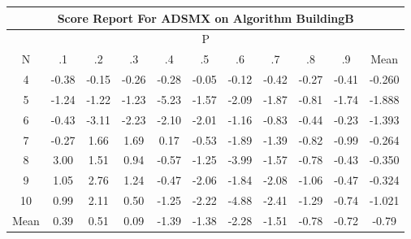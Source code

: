 \documentclass[11pt,a4paper]{report}
\begin{document}
\begin{longtable}{ | c || c | c | c | c | c | c | c | c | c || c |}
\hline
\multicolumn{11}{|c|}{ Score Report For ADSMX on Algorithm BuildingB} \\
\hline
\multicolumn{11}{|c|}{ P } \\
\hline
N & .1 & .2 & .3 & .4 & .5 & .6 & .7 & .8 & .9 & Mean\\
 \hline
 \hline
 \endhead
  4 &  \cellcolor[HTML]{FFF7F7} -0.38 &  \cellcolor[HTML]{FFFFFF} -0.15 &  \cellcolor[HTML]{FFF7F7} -0.26 &  \cellcolor[HTML]{FFF7F7} -0.28 &  \cellcolor[HTML]{FFFFFF} -0.05 &  \cellcolor[HTML]{FFFFFF} -0.12 &  \cellcolor[HTML]{FFF7F7} -0.42 &  \cellcolor[HTML]{FFF7F7} -0.27 &  \cellcolor[HTML]{FFF7F7} -0.41 & -0.260 \\
  5 &  \cellcolor[HTML]{FFDFDF} -1.24 &  \cellcolor[HTML]{FFDFDF} -1.22 &  \cellcolor[HTML]{FFDFDF} -1.23 &  \cellcolor[HTML]{FF8080} -5.23 &  \cellcolor[HTML]{FFD7D7} -1.57 &  \cellcolor[HTML]{FFC7C7} -2.09 &  \cellcolor[HTML]{FFCFCF} -1.87 &  \cellcolor[HTML]{FFE7E7} -0.81 &  \cellcolor[HTML]{FFD7D7} -1.74 & -1.888 \\
  6 &  \cellcolor[HTML]{FFF7F7} -0.43 &  \cellcolor[HTML]{FFAFAF} -3.11 &  \cellcolor[HTML]{FFC7C7} -2.23 &  \cellcolor[HTML]{FFC7C7} -2.10 &  \cellcolor[HTML]{FFCFCF} -2.01 &  \cellcolor[HTML]{FFDFDF} -1.16 &  \cellcolor[HTML]{FFE7E7} -0.83 &  \cellcolor[HTML]{FFF7F7} -0.44 &  \cellcolor[HTML]{FFF7F7} -0.23 & -1.393 \\
  7 &  \cellcolor[HTML]{FFF7F7} -0.27 &  \cellcolor[HTML]{D7D7FF} 1.66 &  \cellcolor[HTML]{D7D7FF} 1.69 &  \cellcolor[HTML]{F7F7FF} 0.17 &  \cellcolor[HTML]{FFEFEF} -0.53 &  \cellcolor[HTML]{FFCFCF} -1.89 &  \cellcolor[HTML]{FFDFDF} -1.39 &  \cellcolor[HTML]{FFE7E7} -0.82 &  \cellcolor[HTML]{FFE7E7} -0.99 & -0.264 \\
  8 &  \cellcolor[HTML]{B7B7FF} 3.00 &  \cellcolor[HTML]{D7D7FF} 1.51 &  \cellcolor[HTML]{E7E7FF} 0.94 &  \cellcolor[HTML]{FFEFEF} -0.57 &  \cellcolor[HTML]{FFDFDF} -1.25 &  \cellcolor[HTML]{FF9797} -3.99 &  \cellcolor[HTML]{FFD7D7} -1.57 &  \cellcolor[HTML]{FFEFEF} -0.78 &  \cellcolor[HTML]{FFF7F7} -0.43 & -0.350 \\
  9 &  \cellcolor[HTML]{E7E7FF} 1.05 &  \cellcolor[HTML]{B7B7FF} 2.76 &  \cellcolor[HTML]{DFDFFF} 1.24 &  \cellcolor[HTML]{FFF7F7} -0.47 &  \cellcolor[HTML]{FFCFCF} -2.06 &  \cellcolor[HTML]{FFCFCF} -1.84 &  \cellcolor[HTML]{FFC7C7} -2.08 &  \cellcolor[HTML]{FFE7E7} -1.06 &  \cellcolor[HTML]{FFF7F7} -0.47 & -0.324 \\
  10 &  \cellcolor[HTML]{E7E7FF} 0.99 &  \cellcolor[HTML]{C7C7FF} 2.11 &  \cellcolor[HTML]{EFEFFF} 0.50 &  \cellcolor[HTML]{FFDFDF} -1.25 &  \cellcolor[HTML]{FFC7C7} -2.22 &  \cellcolor[HTML]{FF8787} -4.88 &  \cellcolor[HTML]{FFBFBF} -2.41 &  \cellcolor[HTML]{FFDFDF} -1.29 &  \cellcolor[HTML]{FFEFEF} -0.74 & -1.021 \\
 \hline
 \hline
Mean &  \cellcolor[HTML]{F7F7FF} 0.39 &  \cellcolor[HTML]{EFEFFF} 0.51 &  \cellcolor[HTML]{FFFFFF} 0.09 &  \cellcolor[HTML]{FFDFDF} -1.39 &  \cellcolor[HTML]{FFDFDF} -1.38 &  \cellcolor[HTML]{FFC7C7} -2.28 &  \cellcolor[HTML]{FFD7D7} -1.51 &  \cellcolor[HTML]{FFEFEF} -0.78 &  \cellcolor[HTML]{FFEFEF} -0.72 &  \cellcolor[HTML]{FFEFEF} -0.79
\end{longtable}
\end{document}
